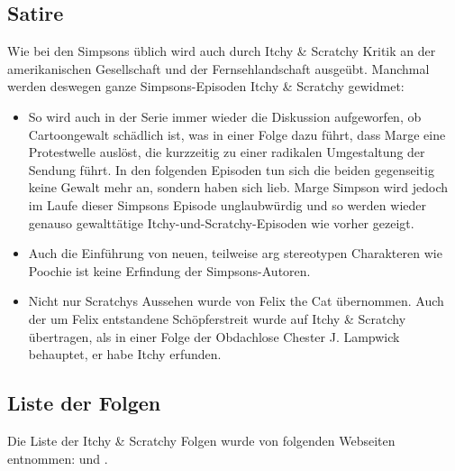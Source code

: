 \begin{appendix}
\subsection{Satire}
Wie bei den Simpsons üblich wird auch durch Itchy \& Scratchy Kritik an der amerikanischen Gesellschaft und der Fernsehlandschaft ausgeübt. Manchmal werden deswegen ganze Simpsons-Episoden Itchy \& Scratchy gewidmet:
\begin{itemize}
	\item So wird auch in der Serie immer wieder die Diskussion aufgeworfen, ob Cartoongewalt schädlich ist, was in einer Folge dazu führt, dass Marge eine Protestwelle auslöst, die kurzzeitig zu einer radikalen Umgestaltung der Sendung führt. In den folgenden Episoden tun sich die beiden gegenseitig keine Gewalt mehr an, sondern haben sich lieb. Marge Simpson wird jedoch im Laufe dieser Simpsons Episode unglaubwürdig und so werden wieder genauso gewalttätige Itchy-und-Scratchy-Episoden wie vorher gezeigt.
	\item Auch die Einführung von neuen, teilweise arg stereotypen Charakteren wie Poochie ist keine Erfindung der Simpsons-Autoren.
	\item Nicht nur Scratchys Aussehen wurde von Felix the Cat übernommen. Auch der um Felix entstandene Schöpferstreit wurde auf Itchy \& Scratchy übertragen, als in einer Folge der Obdachlose Chester J. Lampwick behauptet, er habe Itchy erfunden. 
\end{itemize}



\subsection{Liste der Folgen}\label{ItchyAndScratchy}
Die Liste der Itchy \& Scratchy Folgen wurde von folgenden Webseiten entnommen: \cite{Simpsons001} und \cite{itchy}.


\end{appendix}

